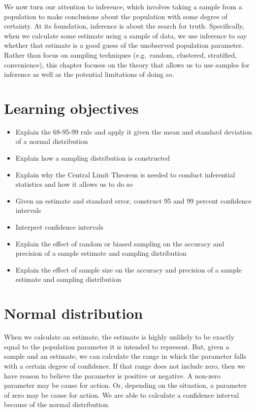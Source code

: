 \documentclass[
]{book}
\providecommand{\tightlist}{%
  \setlength{\itemsep}{0pt}\setlength{\parskip}{0pt}}
\newenvironment{learncheck}%
{%
  \par\vspace{\baselineskip}\noindent 
  \color{Exercise}\begin{itshape}%
  \par\vspace{\baselineskip}\noindent\ignorespaces 
}%
{%
  \end{itshape}\ignorespacesafterend 
}
\begin{document}
We now turn our attention to inference, which involves taking a sample from a population to make conclusions about the population with some degree of certainty. At its foundation, inference is about the search for truth. Specifically, when we calculate some estimate using a sample of data, we use inference to say whether that estimate is a good guess of the unobserved population parameter. Rather than focus on sampling techniques (e.g.~random, clustered, stratified, convenience), this chapter focuses on the theory that allows us to use samples for inference as well as the potential limitations of doing so.

\hypertarget{lo10}{%
\section{Learning objectives}\label{lo10}}

\begin{learncheck}
\begin{itemize}
\tightlist
\item
  Explain the 68-95-99 rule and apply it given the mean and standard
  deviation of a normal distribution
\item
  Explain how a sampling distribution is constructed
\item
  Explain why the Central Limit Theorem is needed to conduct inferential
  statistics and how it allows us to do so
\item
  Given an estimate and standard error, construct 95 and 99 percent
  confidence intervals
\item
  Interpret confidence intervals
\item
  Explain the effect of random or biased sampling on the accuracy and
  precision of a sample estimate and sampling distribution
\item
  Explain the effect of sample size on the accuracy and precision of a
  sample estimate and sampling distribution
\end{itemize}
\end{learncheck}

\hypertarget{normal-distribution}{%
\section{Normal distribution}\label{normal-distribution}}

When we calculate an estimate, the estimate is highly unlikely to be exactly equal to the population parameter it is intended to represent. But, given a sample and an estimate, we can calculate the range in which the parameter falls with a certain degree of confidence. If that range does not include zero, then we have reason to believe the parameter is positive or negative. A non-zero parameter may be cause for action. Or, depending on the situation, a parameter of zero may be cause for action. We are able to calculate a confidence interval because of the normal distribution.
\end{document}
